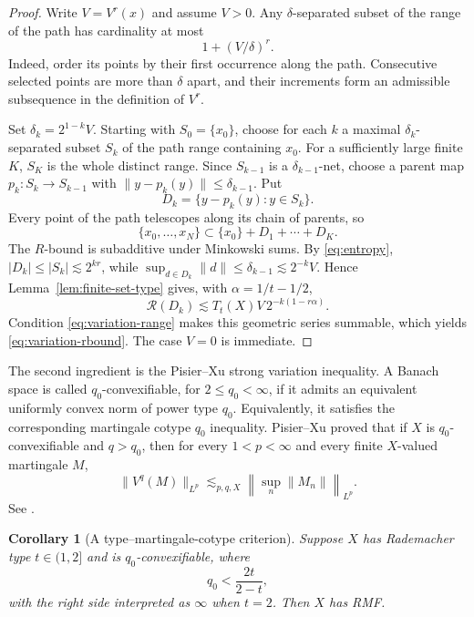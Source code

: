 \documentclass[11pt]{article}
\newtheorem{corollary}[theorem]{Corollary}
\theoremstyle{definition}
\newcommand{\cR}{\mathcal R}
\newcommand{\1}{\mathbf 1}
\begin{document}
\begin{proof}
Write $V=V^r(x)$ and assume $V>0$.  Any $\delta$-separated subset of the range
of the path has cardinality at most
\begin{equation}\label{eq:entropy}
 1+(V/\delta)^r.
\end{equation}
Indeed, order its points by their first occurrence along the path.  Consecutive
selected points are more than $\delta$ apart, and their increments form an
admissible subsequence in the definition of $V^r$.

Set $\delta_k=2^{1-k}V$.  Starting with $S_0=\{x_0\}$, choose for each $k$ a
maximal $\delta_k$-separated subset $S_k$ of the path range containing $x_0$.
For a sufficiently large finite $K$, $S_K$ is the whole distinct range.  Since
$S_{k-1}$ is a $\delta_{k-1}$-net, choose a parent map
$p_k:S_k\to S_{k-1}$ with
$\|y-p_k(y)\|\le\delta_{k-1}$.  Put
\[
 D_k=\{y-p_k(y):y\in S_k\}.
\]
Every point of the path telescopes along its chain of parents, so
\[
 \{x_0,\ldots,x_N\}\subset \{x_0\}+D_1+\cdots+D_K.
\]
The $R$-bound is subadditive under Minkowski sums.  By
\eqref{eq:entropy}, $|D_k|\le|S_k|\lesssim 2^{kr}$, while
$\sup_{d\in D_k}\|d\|\le\delta_{k-1}\lesssim 2^{-k}V$.  Hence
Lemma~\ref{lem:finite-set-type} gives, with
$\alpha=1/t-1/2$,
\[
 \cR(D_k)\lesssim T_t(X)V\,2^{-k(1-r\alpha)}.
\]
Condition \eqref{eq:variation-range} makes this geometric series summable,
which yields \eqref{eq:variation-rbound}.  The case $V=0$ is immediate.
\end{proof}

The second ingredient is the Pisier--Xu strong variation inequality.  A Banach
space is called $q_0$-convexifiable, for $2\le q_0<\infty$, if it admits an
equivalent uniformly convex norm of power type $q_0$.  Equivalently, it
satisfies the corresponding martingale cotype $q_0$ inequality.  Pisier--Xu proved that if $X$ is
$q_0$-convexifiable and $q>q_0$, then for every $1<p<\infty$ and every finite
$X$-valued martingale $M$,
\begin{equation}\label{eq:PX}
 \|V^q(M)\|_{L^p}
 \lesssim_{p,q,X}
 \left\|\sup_n\|M_n\|\right\|_{L^p}.
\end{equation}
See \cite[Theorem 4.2]{PisierXu1988}.

\begin{corollary}[A type--martingale-cotype criterion]\label{cor:variation-rmf}
Suppose $X$ has Rademacher type $t\in(1,2]$ and is $q_0$-convexifiable, where
\begin{equation}\label{eq:criterion}
 q_0<\frac{2t}{2-t},
\end{equation}
with the right side interpreted as $\infty$ when $t=2$.  Then $X$ has RMF.
\end{corollary}
\end{document}
